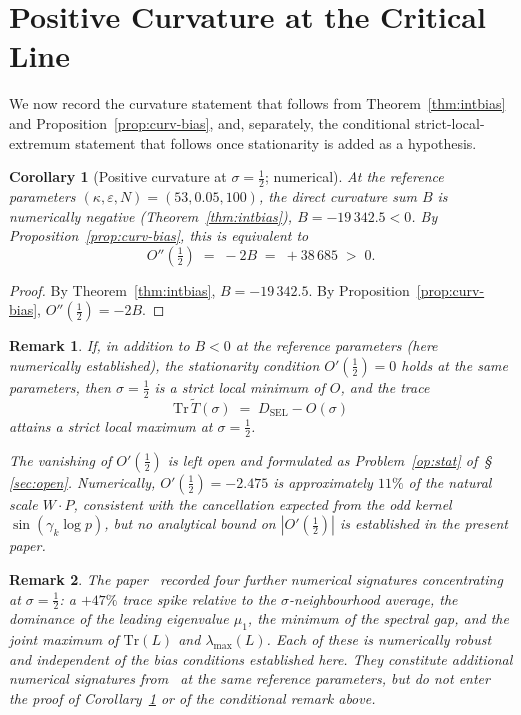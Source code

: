 \documentclass[11pt]{article}
\newtheorem{corollary}[theorem]{Corollary}
\newtheorem*{remark}{Remark}
\newcommand{\Tt}{\widetilde{T}}
\newcommand{\DSEL}{D_{\mathrm{SEL}}}
\begin{document}
\section{Positive Curvature at the Critical Line}
\label{sec:curvcor}

We now record the curvature statement that follows from
Theorem~\ref{thm:intbias} and Proposition~\ref{prop:curv-bias}, and,
separately, the conditional strict-local-extremum statement that
follows once stationarity is added as a hypothesis.

\begin{corollary}[Positive curvature at $\sigma=\tfrac12$; numerical]
\label{cor:curvature}
At the reference parameters $(\kappa,\varepsilon,N)=(53,0.05,100)$,
the direct curvature sum $B$ is numerically negative
(Theorem~\ref{thm:intbias}), $B=-19\,342.5<0$.
By Proposition~\ref{prop:curv-bias}, this is equivalent to
\[
O''(\tfrac12) \;=\; -2B \;=\; +38\,685 \;>\; 0.
\]
\end{corollary}

\begin{proof}
By Theorem~\ref{thm:intbias}, $B=-19\,342.5$.
By Proposition~\ref{prop:curv-bias}, $O''(\tfrac12)=-2B$.
\end{proof}

\begin{remark}
If, in addition to $B<0$ at the reference parameters (here numerically
established), the stationarity condition $O'(\tfrac12)=0$ holds at the
same parameters, then $\sigma=\tfrac12$ is a strict local minimum of
$O$, and the trace
\[
\mathrm{Tr}\,\Tt(\sigma) \;=\; \DSEL - O(\sigma)
\]
attains a strict local maximum at $\sigma=\tfrac12$.

The vanishing of $O'(\tfrac12)$ is left open and formulated as
Problem~\ref{op:stat} of~\S\,\ref{sec:open}.
Numerically, $O'(\tfrac12)=-2.475$ is approximately $11\%$ of the
natural scale $W\cdot P$, consistent with the cancellation expected
from the odd kernel $\sin(\gamma_k\log p)$, but no analytical bound on
$|O'(\tfrac12)|$ is established in the present paper.
\end{remark}

\begin{remark}
The paper~\cite{Paper5} recorded four further numerical signatures
concentrating at $\sigma=\tfrac12$: a $+47\%$ trace spike relative to
the $\sigma$-neighbourhood average, the dominance of the leading
eigenvalue $\mu_1$, the minimum of the spectral gap, and the joint
maximum of $\mathrm{Tr}(L)$ and $\lambda_{\max}(L)$.
Each of these is numerically robust and independent of the bias
conditions established here.
They constitute additional numerical signatures from~\cite{Paper5} at
the same reference parameters, but do not enter the proof of
Corollary~\ref{cor:curvature} or of the conditional remark above.
\end{remark}
\end{document}
